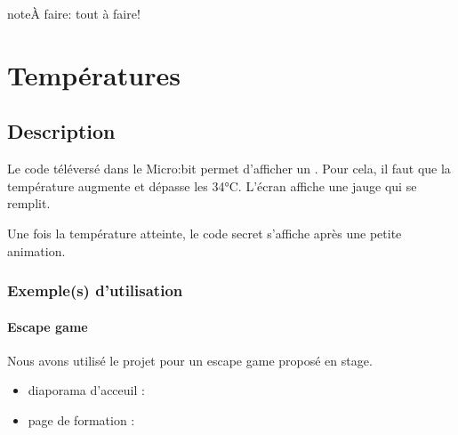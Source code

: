 \documentclass[letterpaper,10pt,french]{sphinxmanual}
\begin{document}
\begin{sphinxadmonition}{note}{\label{projets/pierrot-coder:index-1}À faire:}
tout à faire!
\end{sphinxadmonition}


\section{Températures}
\label{\detokenize{projets/temperature:projettemp}}\label{\detokenize{projets/temperature::doc}}\label{\detokenize{projets/temperature:temperatures}}

\subsection{Description}
\label{\detokenize{projets/temperature:description}}
\noindent{}

Le code téléversé dans le Micro:bit permet d’afficher un .
Pour cela, il faut que la température augmente et
dépasse les 34°C. L’écran affiche une jauge qui se remplit.

Une fois la température atteinte, le code secret s’affiche après
une petite animation.


\subsubsection{Exemple(s) d’utilisation}
\label{\detokenize{projets/temperature:exemple-s-d-utilisation}}

\paragraph{Escape game}
\label{\detokenize{projets/temperature-exemple-escape:projettempescape}}\label{\detokenize{projets/temperature-exemple-escape:escape-game}}\label{\detokenize{projets/temperature-exemple-escape::doc}}
Nous avons utilisé le projet {\hyperref[\detokenize{projets/temperature:projettemp}]{}} pour un escape game proposé en stage.
\begin{itemize}
\item {} 
diaporama d’acceuil : 

\item {} 
page de formation : 

\end{itemize}
\end{document}
